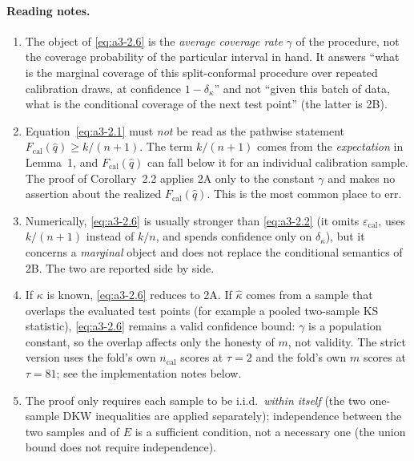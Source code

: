 \paragraph{Reading notes.}
\begin{enumerate}
\item The object of \eqref{eq:a3-2.6} is the \emph{average coverage rate} $\gamma$
  of the procedure, not the coverage probability of the particular interval in
  hand. It answers ``what is the marginal coverage of this split-conformal
  procedure over repeated calibration draws, at confidence $1-\delta_\kappa$''
  and not ``given this batch of data, what is the conditional coverage of the next
  test point'' (the latter is 2B).
\item Equation~\eqref{eq:a3-2.1} must \emph{not} be read as the pathwise statement
  $F_{\mathrm{cal}}(\hat q)\ge k/(n+1)$. The term $k/(n+1)$ comes from the
  \emph{expectation} in Lemma~1, and $F_{\mathrm{cal}}(\hat q)$ can fall below it
  for an individual calibration sample. The proof of Corollary~2.2 applies 2A only
  to the constant $\gamma$ and makes no assertion about the realized
  $F_{\mathrm{cal}}(\hat q)$. This is the most common place to err.
\item Numerically, \eqref{eq:a3-2.6} is usually stronger than \eqref{eq:a3-2.2}
  (it omits $\varepsilon_{\mathrm{cal}}$, uses $k/(n+1)$ instead of $k/n$, and
  spends confidence only on $\delta_\kappa$), but it concerns a \emph{marginal}
  object and does not replace the conditional semantics of 2B. The two are
  reported side by side.
\item If $\kappa$ is known, \eqref{eq:a3-2.6} reduces to 2A. If $\hat\kappa$ comes
  from a sample that overlaps the evaluated test points (for example a pooled
  two-sample KS statistic), \eqref{eq:a3-2.6} remains a valid confidence bound:
  $\gamma$ is a population constant, so the overlap affects only the honesty of
  $m$, not validity. The strict version uses the fold's own $n_{\mathrm{cal}}$
  scores at $\tau=2$ and the fold's own $m$ scores at $\tau=81$; see the
  implementation notes below.
\item The proof only requires each sample to be i.i.d.\ \emph{within itself} (the
  two one-sample DKW inequalities are applied separately); independence between
  the two samples and of $E$ is a sufficient condition, not a necessary one (the
  union bound does not require independence).
\end{enumerate}

